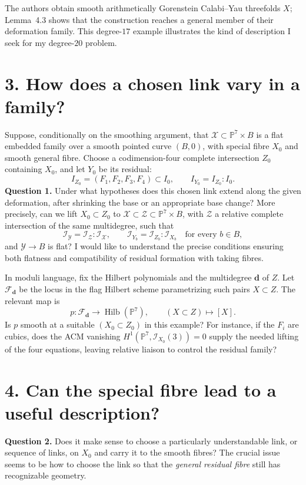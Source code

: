 \documentclass[11pt,a4paper]{article}
\newcommand{\PP}{\mathbb P}
\newcommand{\II}{\mathcal I}
\DeclareMathOperator{\Hilb}{Hilb}
\begin{document}
The authors obtain smooth arithmetically Gorenstein Calabi--Yau
threefolds $X$; Lemma~4.3 shows that the construction reaches a general
member of their deformation family. This degree-$17$ example illustrates
the kind of description I seek for my degree-$20$ problem.

\newpage
\section*{3. How does a chosen link vary in a family?}
Suppose, conditionally on the smoothing argument, that
$\mathcal X\subset\PP^7\times B$ is a flat embedded family over a smooth
pointed curve $(B,0)$, with special fibre $X_0$ and smooth general fibre.
Choose a codimension-four complete intersection $Z_0$ containing $X_0$,
and let $Y_0$ be its residual:
\[
I_{Z_0}=(F_1,F_2,F_3,F_4)\subset I_0,
\qquad I_{Y_0}=I_{Z_0}:I_0.
\]
\textbf{Question 1.}
Under what hypotheses does this chosen link extend along the given
deformation, after shrinking the base or an appropriate base change?
More precisely, can we lift $X_0\subset Z_0$ to
$\mathcal X\subset\mathcal Z\subset\PP^7\times B$, with $\mathcal Z$
a relative complete intersection of the same multidegree, such that
\[
\II_{\mathcal Y}=\II_{\mathcal Z}:\II_{\mathcal X},
\qquad
\II_{Y_b}=\II_{Z_b}:\II_{X_b}
\quad\text{for every }b\in B,
\]
and $\mathcal Y\to B$ is flat? I would like to understand the precise
conditions ensuring both flatness and compatibility of residual formation
with taking fibres.

In moduli language, fix the Hilbert polynomials and the multidegree
$\mathbf d$ of $Z$. Let $\mathcal F_{\mathbf d}$ be the locus in the
flag Hilbert scheme parametrizing such pairs $X\subset Z$. The relevant map is
\[
p:\mathcal F_{\mathbf d}\longrightarrow\Hilb(\PP^7),
\qquad (X\subset Z)\longmapsto[X].
\]
Is $p$ smooth at a suitable $(X_0\subset Z_0)$ in this example?
For instance, if the $F_i$ are cubics, does the ACM vanishing
$H^1(\PP^7,\II_{X_0}(3))=0$ supply the needed lifting of the four equations,
leaving relative liaison to control the residual family?

\section*{4. Can the special fibre lead to a useful description?}
\textbf{Question 2.}
Does it make sense to choose a particularly understandable link, or
sequence of links, on $X_0$ and carry it to the smooth fibres?
The crucial issue seems to be how to choose the link so that the
\emph{general residual fibre} still has recognizable geometry.
\end{document}
